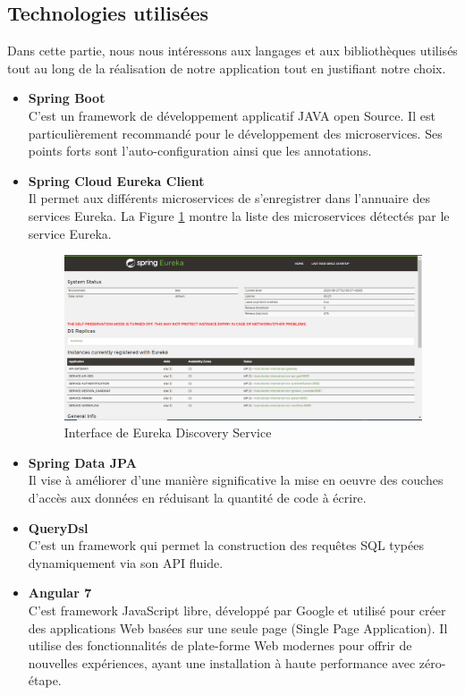 \subsection{Technologies utilisées}
Dans cette partie, nous nous intéressons aux langages et aux bibliothèques utilisés tout au long de la réalisation de notre application tout en justifiant notre choix.
\begin{itemize}
    \item \textbf{Spring Boot}\\
    C'est un framework de développement applicatif JAVA open Source. Il est particulièrement recommandé pour le développement des microservices. Ses points forts sont l'auto-configuration ainsi que les annotations.
    \item \textbf{Spring Cloud Eureka Client}\\
    Il permet aux différents microservices de s'enregistrer dans l'annuaire des services Eureka. La Figure \ref{fig:capture_eureka} montre la liste des microservices détectés par le service Eureka. 
    \begin{figure}[H]
     \centering
     \includegraphics[scale=0.47]{img/capture eureka.PNG}
     \caption{Interface de Eureka Discovery Service}
     \label{fig:capture_eureka}
 \end{figure}
    \item \textbf{Spring Data JPA}\\
    Il vise à améliorer d'une manière significative la mise en oeuvre des couches d'accès aux données en réduisant la quantité de code à écrire.
    \item \textbf{QueryDsl}\\
    C'est un framework qui permet la construction des requêtes SQL typées dynamiquement via son API fluide.
    \item \textbf{Angular 7}\\
    C'est framework JavaScript libre, développé par Google et utilisé pour créer des applications Web basées sur une seule page (Single Page Application). Il utilise des fonctionnalités de plate-forme Web modernes pour offrir de nouvelles expériences, ayant une installation à haute performance avec zéro-étape.
\end{itemize}
